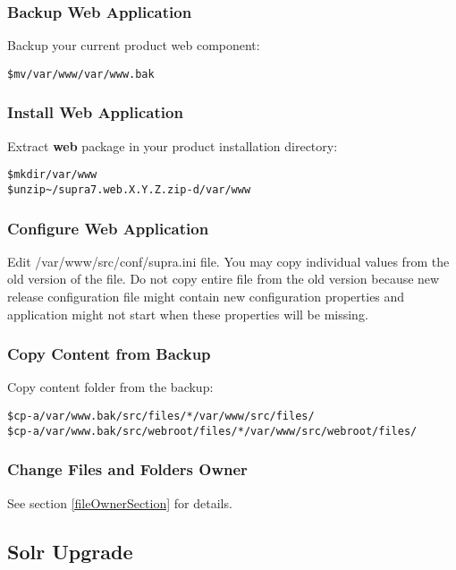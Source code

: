\documentclass[12pt]{article}
\newcommand{\vigPackageName}{supra7}
\newcommand{\vigPathToProject}{/var/www}
\newcommand{\vigPathToSrc}{/src}
\newcommand{\vigReleasePath}{\textasciitilde/}
\newcommand{\vigReleaseVersion}{X.Y.Z}
\begin{document}
\subsubsection{Backup Web Application}
Backup your current product web component:

\begin{alltt}
\$ mv \vigPathToProject \vigPathToProject.bak
\end{alltt}

\subsubsection{Install Web Application}
Extract \textbf{web} package in your product installation directory:

\begin{alltt}
\$ mkdir \vigPathToProject
\$ unzip {\vigReleasePath}{\vigPackageName}.web.\vigReleaseVersion.zip -d \vigPathToProject
\end{alltt}

\subsubsection{Configure Web Application}
Edit \textsf{\vigPathToProject\vigPathToSrc/conf/supra.ini} file. You may copy individual values from the old version of the file. Do not copy entire file from the old version because new release configuration file might contain new configuration properties and application might not start when these properties will be missing.

\subsubsection{Copy Content from Backup}
Copy content folder from the backup:

\begin{alltt}
\$ cp -a \vigPathToProject.bak\vigPathToSrc/files/* \vigPathToProject\vigPathToSrc/files/
\$ cp -a \vigPathToProject.bak\vigPathToSrc/webroot/files/* \vigPathToProject\vigPathToSrc/webroot/files/
\end{alltt}

\subsubsection{Change Files and Folders Owner}

See section \ref{fileOwnerSection} for details.

\subsection{Solr Upgrade}
\end{document}
